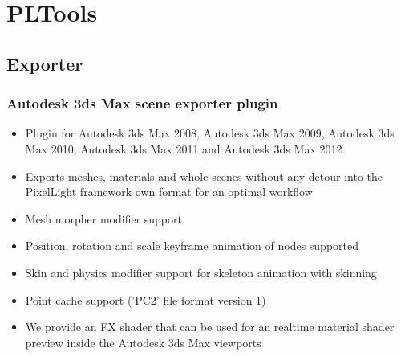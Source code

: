\chapter{PLTools}




\section{Exporter}


\subsection{Autodesk 3ds Max scene exporter plugin}
\begin{itemize}
\item{Plugin for Autodesk 3ds Max 2008, Autodesk 3ds Max 2009, Autodesk 3ds Max 2010, Autodesk 3ds Max 2011 and Autodesk 3ds Max 2012}
\item{Exports meshes, materials and whole scenes without any detour into the PixelLight framework own format for an optimal workflow}
\item{Mesh morpher modifier support}
\item{Position, rotation and scale keyframe animation of nodes supported}
\item{Skin and physics modifier support for skeleton animation with skinning}
\item{Point cache support ('PC2' file format version 1)}
\item{We provide an FX shader that can be used for an realtime material shader preview inside the Autodesk 3ds Max viewports}
\end{itemize}
